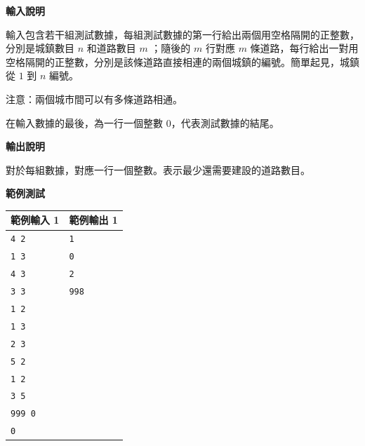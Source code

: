     \textbf{輸入說明}

    輸入包含若干組測試數據，每組測試數據的第一行給出兩個用空格隔開的正整數，分別是城鎮數目 $n$ 和道路數目 $m$ ；隨後的 $m$ 行對應 $m$ 條道路，每行給出一對用空格隔開的正整數，分別是該條道路直接相連的兩個城鎮的編號。簡單起見，城鎮從 $1$ 到 $n$ 編號。

    注意：兩個城市間可以有多條道路相通。

    在輸入數據的最後，為一行一個整數 $0$，代表測試數據的結尾。
    
    \textbf{輸出說明}

    對於每組數據，對應一行一個整數。表示最少還需要建設的道路數目。

    \textbf{範例測試}

    \begin{tabular}{|m{7cm}|m{7cm}|}
        \hline
        範例輸入 1 & 範例輸出 1 \\
        \hline
        \verb|4 2| & \verb|1| \\
        \verb|1 3| & \verb|0| \\
        \verb|4 3| & \verb|2| \\
        \verb|3 3| & \verb|998| \\
        \verb|1 2| & \\
        \verb|1 3| & \\
        \verb|2 3| & \\
        \verb|5 2| & \\
        \verb|1 2| & \\
        \verb|3 5| & \\
        \verb|999 0| & \\
        \verb|0| & \\
        \hline
    \end{tabular}
